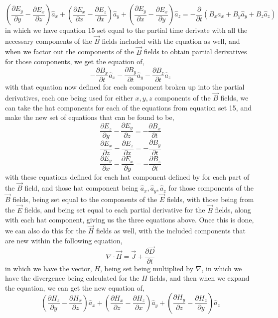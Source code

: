 \documentclass[]{article}
\begin{document}
\[(\frac{\partial{E}_y}{\partial{y}} - \frac{\partial{E}_x}{\partial{z}})\hat{a}_x + (\frac{\partial{E}_x}{\partial{x}} - \frac{\partial{E}_z}{\partial{x}}) \hat{a}_y + (\frac{\partial{E}_y}{\partial{x}} - \frac{\partial{E}_x}{\partial{y}})\hat{a}_z = -\frac{\partial}{\partial{t}}(B_x\hat{a}_x+B_y\hat{a}_y +B_z\hat{a}_z)\]
in which we have equation 15 set equal to the partial time derivate with all the necessary components of the $\vec{B}$ fields included with the equation as well, and when we factor out the components of the $\vec{B}$ fields to obtain partial derivatives for those components, we get the equation of,
\begin{equation}
-\frac{\partial{B}_x}{\partial{t}}\hat{a}_x - \frac{\partial{B}_y}{\partial{t}}\hat{a}_y - \frac{\partial{B}_z}{\partial{t}}\hat{a}_z
\end{equation}
with that equation now defined for each component broken up into the partial derivatives, each one being used for either $x,y,z$ components of the $\vec{B}$ fields, we can take the hat components for each of the equations from equation set 15, and make the new set of equations that can be found to be,
\[\frac{\partial{E}_z}{\partial{y}} - \frac{\partial{E}_y}{\partial{z}} = -\frac{\partial{B}_x}{\partial{t}}\]
\[\frac{\partial{E}_x}{\partial{z}} - \frac{\partial{E}_z}{\partial{x}} = -\frac{\partial{B}_y}{\partial{t}}\]
\[\frac{\partial{E}_y}{\partial{x}} - \frac{\partial{E}_x}{\partial{y}} = -\frac{\partial{B}_z}{\partial{t}}\]
with these equations defined for each hat component defined by for each part of the $\vec{B}$ field, and those hat component being $\hat{a}_x, \hat{a}_y, \hat{a}_z$ for those components of the $\vec{B}$ fields, being set equal to the components of the $\vec{E}$ fields, with those being from the $\vec{E}$ fields, and being set equal to each partial derivative for the $\vec{B}$ fields, along with each hat component, giving us the three equations above. Once this is done, we can also do this for the $\vec{H}$ fields as well, with the included components that are new within the following equation,
\[\nabla \cdot \vec{H} = \vec{J} + \frac{\partial{\vec{D}}}{\partial{t}}\]
in which we have the vector, $H$, being set being multiplied by $\nabla$, in which we have the divergence being calculated for the $H$ fields, and then when we expand the equation, we can get the new equation of,
\linebreak
\begin{equation}
(\frac{\partial{H}_z}{\partial{y}} - \frac{\partial{H}_x}{\partial{z}})\hat{a}_x + (\frac{\partial{H}_x}{\partial{z}} - \frac{\partial{H}_z}{\partial{x}})\hat{a}_y + (\frac{\partial{H}_y}{\partial{z}} - \frac{\partial{H}_z}{\partial{y}})\hat{a}_z
\end{equation}
\end{document}
